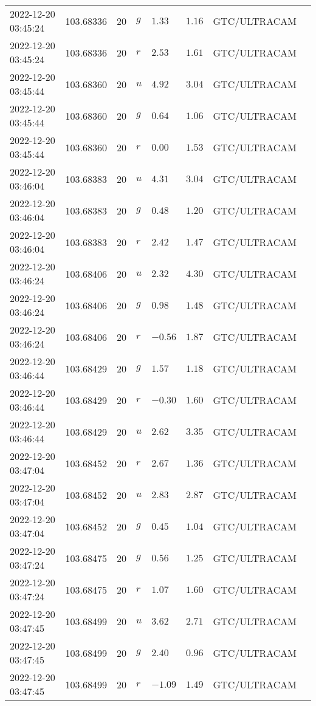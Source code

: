 \documentclass{nature_plusfigure}
\begin{document}
\begin{supplement}
\begin{center}
\begin{longtable}{llllllll}
2022-12-20 03:45:24 & 103.68336 & 20 & $g$ & $1.33$ & $1.16$ & GTC/ULTRACAM &  \\ 
2022-12-20 03:45:24 & 103.68336 & 20 & $r$ & $2.53$ & $1.61$ & GTC/ULTRACAM &  \\ 
2022-12-20 03:45:44 & 103.68360 & 20 & $u$ & $4.92$ & $3.04$ & GTC/ULTRACAM &  \\ 
2022-12-20 03:45:44 & 103.68360 & 20 & $g$ & $0.64$ & $1.06$ & GTC/ULTRACAM &  \\ 
2022-12-20 03:45:44 & 103.68360 & 20 & $r$ & $0.00$ & $1.53$ & GTC/ULTRACAM &  \\ 
2022-12-20 03:46:04 & 103.68383 & 20 & $u$ & $4.31$ & $3.04$ & GTC/ULTRACAM &  \\ 
2022-12-20 03:46:04 & 103.68383 & 20 & $g$ & $0.48$ & $1.20$ & GTC/ULTRACAM &  \\ 
2022-12-20 03:46:04 & 103.68383 & 20 & $r$ & $2.42$ & $1.47$ & GTC/ULTRACAM &  \\ 
2022-12-20 03:46:24 & 103.68406 & 20 & $u$ & $2.32$ & $4.30$ & GTC/ULTRACAM &  \\ 
2022-12-20 03:46:24 & 103.68406 & 20 & $g$ & $0.98$ & $1.48$ & GTC/ULTRACAM &  \\ 
2022-12-20 03:46:24 & 103.68406 & 20 & $r$ & $-0.56$ & $1.87$ & GTC/ULTRACAM &  \\ 
2022-12-20 03:46:44 & 103.68429 & 20 & $g$ & $1.57$ & $1.18$ & GTC/ULTRACAM &  \\ 
2022-12-20 03:46:44 & 103.68429 & 20 & $r$ & $-0.30$ & $1.60$ & GTC/ULTRACAM &  \\ 
2022-12-20 03:46:44 & 103.68429 & 20 & $u$ & $2.62$ & $3.35$ & GTC/ULTRACAM &  \\ 
2022-12-20 03:47:04 & 103.68452 & 20 & $r$ & $2.67$ & $1.36$ & GTC/ULTRACAM &  \\ 
2022-12-20 03:47:04 & 103.68452 & 20 & $u$ & $2.83$ & $2.87$ & GTC/ULTRACAM &  \\ 
2022-12-20 03:47:04 & 103.68452 & 20 & $g$ & $0.45$ & $1.04$ & GTC/ULTRACAM &  \\ 
2022-12-20 03:47:24 & 103.68475 & 20 & $g$ & $0.56$ & $1.25$ & GTC/ULTRACAM &  \\ 
2022-12-20 03:47:24 & 103.68475 & 20 & $r$ & $1.07$ & $1.60$ & GTC/ULTRACAM &  \\ 
2022-12-20 03:47:45 & 103.68499 & 20 & $u$ & $3.62$ & $2.71$ & GTC/ULTRACAM &  \\ 
2022-12-20 03:47:45 & 103.68499 & 20 & $g$ & $2.40$ & $0.96$ & GTC/ULTRACAM &  \\ 
2022-12-20 03:47:45 & 103.68499 & 20 & $r$ & $-1.09$ & $1.49$ & GTC/ULTRACAM &  \\ 

\end{longtable}
\end{center}
\end{supplement}
\end{document}
